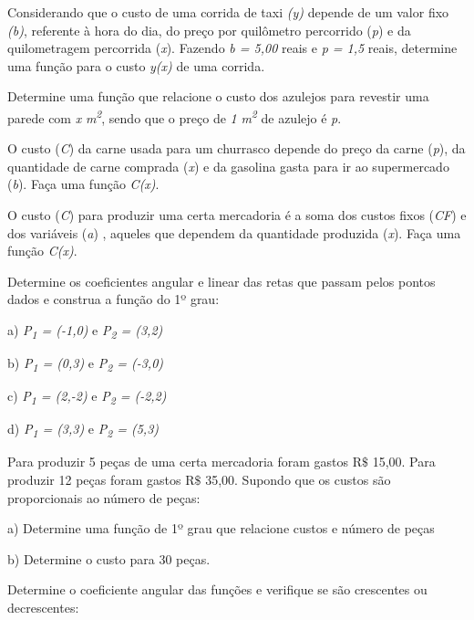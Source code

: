 \begin{exercicios}
\begin{table}[H]
\begin{tabular}{p{0.49in}p{0.29in}p{0.29in}p{0.29in}p{0.29in}p{0.29in}}
\end{tabular}
 \end{table}

\exitem{} Considerando que o custo de uma corrida de taxi \textit{(y)} depende de um valor fixo \textit{(b)}, referente à hora do dia, do preço por quilômetro percorrido (\textit{p}) e da quilometragem percorrida (\textit{x}). Fazendo \textit{b = 5,00} reais e \textit{p = 1,5} reais, determine uma função para o custo \textit{y(x)} de uma corrida.

\exitem{} Determine uma função que relacione o custo dos azulejos para revestir uma parede com \textit{x} \textit{m\textsuperscript{2}}, sendo que o preço de \textit{1} \textit{m\textsuperscript{2}}   de azulejo é \textit{p}.

\exitem{} O custo (\textit{C}) da carne usada para um churrasco depende do preço da carne (\textit{p}), da quantidade de carne comprada (\textit{x}) e da gasolina gasta para ir ao supermercado (\textit{b}). Faça uma função \textit{C(x)}.

\exitem{} O custo (\textit{C}) para produzir uma certa mercadoria é a soma dos custos fixos (\textit{CF}) e dos variáveis (\textit{a}) , aqueles que dependem da quantidade produzida (\textit{x}). Faça uma função \textit{C(x)}.

\exitem{} Determine os coeficientes angular e linear das retas que passam pelos pontos dados e construa a função do 1º grau:

\begin{multicols}{2}
	a) \textit{P\textsubscript{1} = (-1,0)}  e  \textit{P\textsubscript{2} = (3,2)}

	b) \textit{P\textsubscript{1} = (0,3)}  e  \textit{P\textsubscript{2} = (-3,0)}

	c) \textit{P\textsubscript{1} = (2,-2)}  e  \textit{P\textsubscript{2} = (-2,2)}

	d) \textit{P\textsubscript{1} = (3,3)}  e  \textit{P\textsubscript{2} = (5,3)}
\end{multicols}

\exitem{} Para produzir 5 peças de uma certa mercadoria foram gastos R$\$$  15,00. Para produzir 12 peças foram gastos R$\$$  35,00.  Supondo que os custos são proporcionais ao número de peças:

a) Determine uma função de 1º grau que relacione custos e número de peças

b) Determine o custo para 30 peças. 

\exitem{} Determine o coeficiente angular das funções e verifique se são crescentes ou decrescentes:


\end{exercicios}
